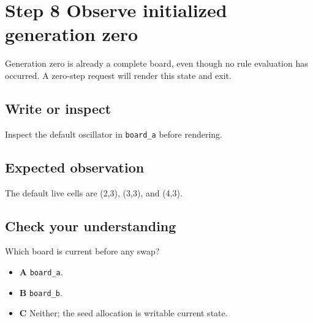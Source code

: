 \section{Step 8 Observe initialized generation
  zero}\label{008-life-generations-s08-step-8-observe-initialized-generation-zero}

Generation zero is already a complete board, even though no rule
evaluation has occurred. A zero-step request will render this state and
exit.

\subsection{Write or
  inspect}\label{008-life-generations-s08-write-or-inspect}

Inspect the default oscillator in \texttt{board\_a} before rendering.

\subsection{Expected
  observation}\label{008-life-generations-s08-expected-observation}

The default live cells are (2,3), (3,3), and (4,3).

\subsection{Check your
  understanding}\label{008-life-generations-s08-check-your-understanding}

Which board is current before any swap?

\begin{itemize}
  \tightlist
  \item
        \textbf{A} \texttt{board\_a}.
  \item
        \textbf{B} \texttt{board\_b}.
  \item
        \textbf{C} Neither; the seed allocation is writable current state.
\end{itemize}
